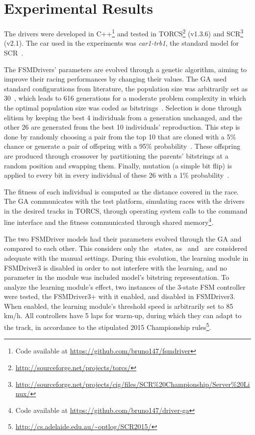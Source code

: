 \section{Experimental Results}\label{sec:4}%
\newcommand{\car}[1]{\emph{#1}}%

The drivers were developed in C++\footnote{Code available at \url{https://github.com/bruno147/fsmdriver}} and tested in TORCS\footnote{\url{http://sourceforge.net/projects/torcs/}} (v1.3.6) and SCR\footnote{\url{http://sourceforge.net/projects/cig/files/SCR\%20Championship/Server\%20Linux/}} (v2.1). The car used in the experiments was \car{car1-trb1}, the standard model for SCR~\cite{SCR}.

The FSMDrivers' parameters are evolved through a genetic algorithm, aiming to improve their racing performances by changing their values. The GA used standard configurations from literature, the population size was arbitrarily set as 30~\cite{RATES}, which leads to 616 generations for a moderate problem complexity in which the optimal population size was coded as bitstrings~\cite{218485}. Selection is done through elitism by keeping the best 4 individuals from a generation unchanged, and the other 26 are generated from the best 10 individuals' reproduction. This step is done by randomly choosing a pair from the top 10 that are cloned with a 5\% chance or generate a pair of offspring with a 95\% probability~\cite{RATES}. These offspring are produced through crossover by partitioning the parents' bitstrings at a random position and swapping them. Finally, mutation (a simple bit flip) is applied to every bit in every individual of these 26 with a 1\% probability~\cite{RATES}.

The fitness of each individual is computed as the distance covered in the race. The GA communicates with the test platform, simulating races with the drivers in the desired tracks in TORCS, through operating system calls to the command line interface and the fitness communicated through shared memory\footnote{Code available at \url{https://github.com/bruno147/driver-ga}}.

The two FSMDriver models had their parameters evolved through the GA and compared to each other. This considers only the \racing~states, as \OT~and \St~are considered adequate with the manual settings. During this evolution, the learning module in FSMDriver3 is disabled in order to not interfere with the learning, and no parameter in the module was included model's bitstring representation. To analyze the learning module's effect, two instances of the 3-state FSM controller were tested, the FSMDriver3+ with it enabled, and disabled in FSMDriver3. When enabled, the learning module's threshold speed is arbitrarily set to 85 km/h. All controllers have 5 laps for warm-up, during which they can adapt to the track, in accordance to the stipulated 2015 Championship rules\footnote{\url{http://cs.adelaide.edu.au/~optlog/SCR2015/}}.

